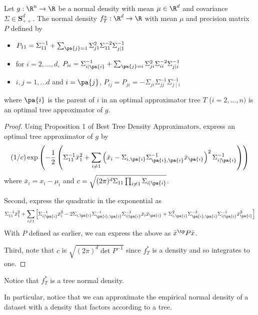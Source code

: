 \begin{prop}


Let $g: \R^n \to \R$ be a normal density with mean $\mu \in \R^d$ and covariance $\Sigma \in \mathbf{S}^d_{++}$.
The normal density $f^*_T: \R^d \to \R$ with mean $\mu$ and precision matrix $P$ defined by
  \begin{itemize}
    \item $P_{11} = \Sigma_{11}^{-1} + \sum_{\pa{j} = 1}
\Sigma_{j1}^2\Sigma_{11}^{-2}\Sigma_{j\mid 1}^{-1}$
      \item for $i = 2, \dots, d$, $P_{ii} = \Sigma_{i\mid\pa{i}}^{-1} + \sum_{\pa{j} = i} \Sigma_{ji}^2\Sigma_{ii}^{-2}\Sigma_{j\mid i}^{-1}$
      \item $i, j = 1, \dots d$ and $i = \pa{j}$, $P_{ij} = P_{ji} = -\Sigma_{ji}\Sigma_{jj}^{-1}\Sigma_{j \mid i}^{-1}$
  \end{itemize}
  where $\pa{i}$ is the parent of $i$ in an optimal approximator tree $T$ ($i = 2, \dots, n)$ is an optimal tree approximator of $g$.

\begin{proof}

Using Proposition 1 of Best Tree Density Approximators, express an optimal tree approximator of $g$ by
$$
(1/c)
\exp\left(
  -\frac{1}{2}
  \left(
    \Sigma_{11}^{-1}\bar{x}_1^2 +
      \sum_{i \neq 1}
            \left(\bar{x}_i - \Sigma_{i,\pa{i}}\Sigma_{\pa{i},\pa{i}}^{-1}\bar{x}_{\pa{i}}\right)^2\Sigma_{i\mid\pa{i}}^{-1}
      \right)
    \right)
$$
where $\bar{x}_i = x_i - \mu_i$ and $c = \sqrt{(2\pi)^d\Sigma_{11} \prod_{i \neq 1} \Sigma_{i \mid \pa{i}}}$.

Second, express the quadratic in the exponential as
$$
  \Sigma_{11}^{-1}\bar{x}_1^2 +
    \sum_{i \neq 1}
    \left[
      \Sigma_{i\mid\pa{i}}^{-1}
      \bar{x}_i^2
      -
      2
      \Sigma_{i,\pa{i}}\Sigma_{\pa{i},\pa{i}}^{-1}\Sigma_{i\mid\pa{i}}^{-1}
      \bar{x}_i\bar{x}_{\pa{i}}
      +
      \Sigma_{i,\pa{i}}^2\Sigma_{\pa{i},\pa{i}}^{-2}\Sigma_{i\mid\pa{i}}^{-1}
      \bar{x}_{\pa{i}}^2
    \right]
$$
With $P$ defined as earlier, we can express the above as $\bar{x}^{\tp} P \bar{x}$.

Third, note that $c$ is $\sqrt{(2\pi)^d\det P^{-1}}$ since $f^*_T$ is a density and so integrates to one.

\end{proof}

\end{prop}

Notice that $f^*_T$ is a tree normal density.


In particular, notice that we can approximate the empirical normal density of a dataset with a density that factors according to a tree.
\strats
